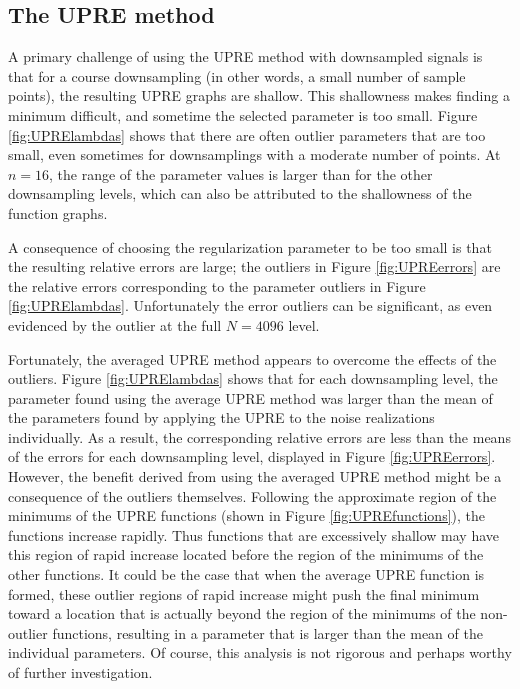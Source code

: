\documentclass[12pt]{article}
\begin{document}
\subsection{The UPRE method} \label{The UPRE method}
A primary challenge of using the UPRE method with downsampled signals is that for a course downsampling (in other words, a small number of sample points), the resulting UPRE graphs are shallow. This shallowness makes finding a minimum difficult, and sometime the selected parameter is too small. Figure \ref{fig:UPRElambdas} shows that there are often outlier parameters that are too small, even sometimes for downsamplings with a moderate number of points. At $n = 16$, the range of the parameter values is larger than for the other downsampling levels, which can also be attributed to the shallowness of the function graphs. \par 
A consequence of choosing the regularization parameter to be too small is that the resulting relative errors are large; the outliers in Figure \ref{fig:UPREerrors} are the relative errors corresponding to the parameter outliers in Figure \ref{fig:UPRElambdas}. Unfortunately the error outliers can be significant, as even evidenced by the outlier at the full $N = 4096$ level. \par 
Fortunately, the averaged UPRE method appears to overcome the effects of the outliers. Figure \ref{fig:UPRElambdas} shows that for each downsampling level, the parameter found using the average UPRE method was larger than the mean of the parameters found by applying the UPRE to the noise realizations individually. As a result, the corresponding relative errors are less than the means of the errors for each downsampling level, displayed in Figure \ref{fig:UPREerrors}. However, the benefit derived from using the averaged UPRE method might be a consequence of the outliers themselves. Following the approximate region of the minimums of the UPRE functions (shown in Figure \ref{fig:UPREfunctions}), the functions increase rapidly. Thus functions that are excessively shallow may have this region of rapid increase located before the region of the minimums of the other functions. It could be the case that when the average UPRE function is formed, these outlier regions of rapid increase might push the final minimum toward a location that is actually beyond the region of the minimums of the non-outlier functions, resulting in a parameter that is larger than the mean of the individual parameters. Of course, this analysis is not rigorous and perhaps worthy of further investigation. 
\end{document}
